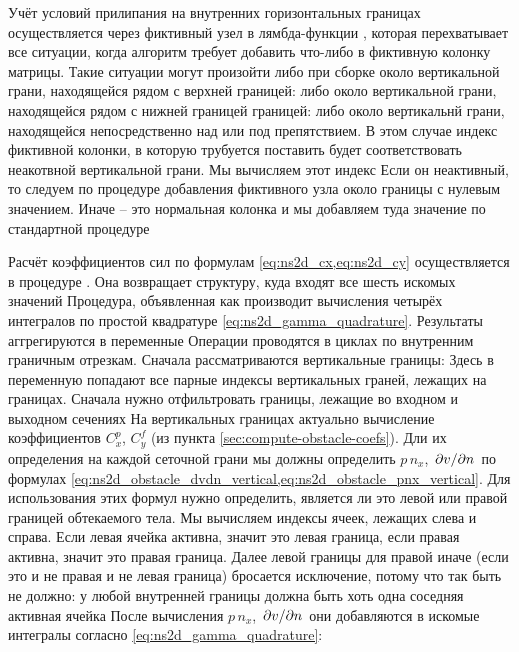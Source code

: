 Учёт условий прилипания на внутренних горизонтальных
границах осуществляется через фиктивный узел в лямбда-функции ,
которая перехватывает все ситуации, когда алгоритм требует добавить что-либо в фиктивную колонку матрицы.
Такие ситуации могут произойти либо при сборке
около вертикальной грани, находящейся рядом с верхней границей:
либо около вертикальной грани, находящейся рядом с нижней границей границей:
либо около вертикальнй грани, находящейся непосредственно над или под препятствием.
В этом случае индекс фиктивной колонки, в которую трубуется поставить будет
соответствовать неакотвной вертикальной грани.
Мы вычисляем этот индекс
Если он неактивный, то следуем по процедуре добавления фиктивного узла около
границы с нулевым значением.
Иначе -- это нормальная колонка и мы добавляем туда значение по стандартной процедуре

\label{sec:prog-cxcy}
Расчёт коэффициентов сил по формулам \cref{eq:ns2d_cx,eq:ns2d_cy} осуществляется в процедуре .
Она возвращает структуру, куда входят все шесть искомых значений
Процедура, объявленная как
производит вычисления четырёх интегралов по простой квадратуре
\cref{eq:ns2d_gamma_quadrature}.
Результаты аггрегируются в переменные
Операции проводятся в циклах по внутренним граничным отрезкам.
Сначала рассматриваются вертикальные границы:
Здесь в переменную  попадают все парные индексы вертикальных граней, лежащих
на границах. Сначала нужно отфильтровать границы, лежащие во входном и выходном сечениях
На вертикальных границах актуально вычисление коэффициентов $C^p_x$, $C^f_y$ (из пункта \ref{sec:compute-obstacle-coefs}).
Дли их определения на каждой сеточной грани мы должны определить
$p\,n_x$, $\left.\partial v\middle/\partial n\right.$ по формулах \cref{eq:ns2d_obstacle_dvdn_vertical,eq:ns2d_obstacle_pnx_vertical}.
Для использования этих формул нужно определить, является ли это левой или правой границей обтекаемого тела.
Мы вычисляем индексы ячеек, лежащих слева и справа.
Если левая ячейка активна, значит это левая граница, если правая активна, значит это правая граница.
Далее левой границы
для правой
иначе (если это и не правая и не левая граница) бросается исключение,
потому что так быть не должно: у любой внутренней границы должна быть хоть одна соседняя активная ячейка
После вычисления $p\,n_x$, $\left.\partial v\middle/\partial n\right.$ они добавляются
в искомые интегралы согласно
\cref{eq:ns2d_gamma_quadrature}:

